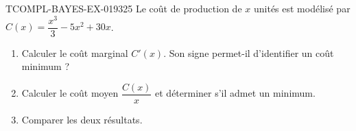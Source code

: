 \begin{exercice}{TCOMPL-BAYES-EX-019}{3}{25}
Le coût de production de $x$ unités est modélisé par $C(x) = \dfrac{x^3}{3} - 5x^2 + 30x$.
\begin{enumerate}
  \item Calculer le coût marginal $C'(x)$. Son signe permet-il d'identifier un coût minimum ?
  \item Calculer le coût moyen $\dfrac{C(x)}{x}$ et déterminer s'il admet un minimum.
  \item Comparer les deux résultats.
\end{enumerate}

\end{exercice}
